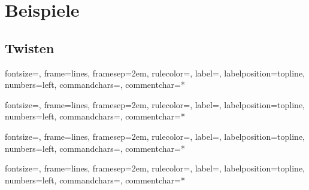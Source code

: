 \documentclass[a4paper, notitlepage, 12pt]{scrartcl}
\begin{document}
\section{Beispiele}
\subsection{Twisten}
%
{fontsize=\footnotesize,
	frame=lines,  %
	framesep=2em, %
	rulecolor=\color{Gray},
	label=,
	labelposition=topline,
	numbers=left,
	commandchars=\|\(\), %
	commentchar=*        %
}
\begingroup
{}
\endgroup

%
{fontsize=\footnotesize,
	frame=lines,  %
	framesep=2em, %
	rulecolor=\color{Gray},
	label=,
	labelposition=topline,
	numbers=left,
	commandchars=\|\(\), %
	commentchar=*        %
}
\begingroup
{}
\endgroup

%
{fontsize=\footnotesize,
	frame=lines,  %
	framesep=2em, %
	rulecolor=\color{Gray},
	label=,
	labelposition=topline,
	numbers=left,
	commandchars=\|\(\), %
	commentchar=*        %
}
\begingroup
{}
\endgroup

%
{fontsize=\footnotesize,
	frame=lines,  %
	framesep=2em, %
	rulecolor=\color{Gray},
	label=,
	labelposition=topline,
	numbers=left,
	commandchars=\|\(\), %
	commentchar=*        %
}
\begingroup
{}
\endgroup
\end{document}
